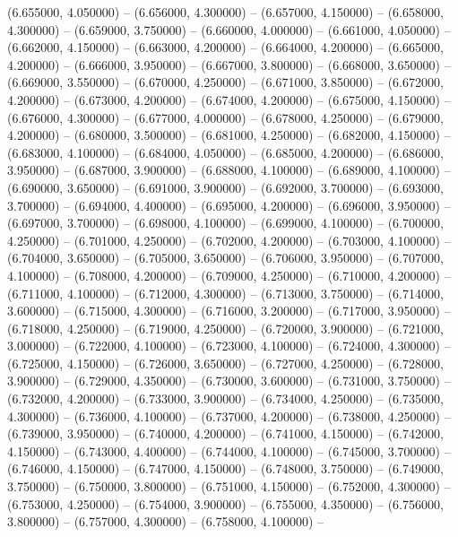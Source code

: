 (6.655000, 4.050000) -- 
(6.656000, 4.300000) -- 
(6.657000, 4.150000) -- 
(6.658000, 4.300000) -- 
(6.659000, 3.750000) -- 
(6.660000, 4.000000) -- 
(6.661000, 4.050000) -- 
(6.662000, 4.150000) -- 
(6.663000, 4.200000) -- 
(6.664000, 4.200000) -- 
(6.665000, 4.200000) -- 
(6.666000, 3.950000) -- 
(6.667000, 3.800000) -- 
(6.668000, 3.650000) -- 
(6.669000, 3.550000) -- 
(6.670000, 4.250000) -- 
(6.671000, 3.850000) -- 
(6.672000, 4.200000) -- 
(6.673000, 4.200000) -- 
(6.674000, 4.200000) -- 
(6.675000, 4.150000) -- 
(6.676000, 4.300000) -- 
(6.677000, 4.000000) -- 
(6.678000, 4.250000) -- 
(6.679000, 4.200000) -- 
(6.680000, 3.500000) -- 
(6.681000, 4.250000) -- 
(6.682000, 4.150000) -- 
(6.683000, 4.100000) -- 
(6.684000, 4.050000) -- 
(6.685000, 4.200000) -- 
(6.686000, 3.950000) -- 
(6.687000, 3.900000) -- 
(6.688000, 4.100000) -- 
(6.689000, 4.100000) -- 
(6.690000, 3.650000) -- 
(6.691000, 3.900000) -- 
(6.692000, 3.700000) -- 
(6.693000, 3.700000) -- 
(6.694000, 4.400000) -- 
(6.695000, 4.200000) -- 
(6.696000, 3.950000) -- 
(6.697000, 3.700000) -- 
(6.698000, 4.100000) -- 
(6.699000, 4.100000) -- 
(6.700000, 4.250000) -- 
(6.701000, 4.250000) -- 
(6.702000, 4.200000) -- 
(6.703000, 4.100000) -- 
(6.704000, 3.650000) -- 
(6.705000, 3.650000) -- 
(6.706000, 3.950000) -- 
(6.707000, 4.100000) -- 
(6.708000, 4.200000) -- 
(6.709000, 4.250000) -- 
(6.710000, 4.200000) -- 
(6.711000, 4.100000) -- 
(6.712000, 4.300000) -- 
(6.713000, 3.750000) -- 
(6.714000, 3.600000) -- 
(6.715000, 4.300000) -- 
(6.716000, 3.200000) -- 
(6.717000, 3.950000) -- 
(6.718000, 4.250000) -- 
(6.719000, 4.250000) -- 
(6.720000, 3.900000) -- 
(6.721000, 3.000000) -- 
(6.722000, 4.100000) -- 
(6.723000, 4.100000) -- 
(6.724000, 4.300000) -- 
(6.725000, 4.150000) -- 
(6.726000, 3.650000) -- 
(6.727000, 4.250000) -- 
(6.728000, 3.900000) -- 
(6.729000, 4.350000) -- 
(6.730000, 3.600000) -- 
(6.731000, 3.750000) -- 
(6.732000, 4.200000) -- 
(6.733000, 3.900000) -- 
(6.734000, 4.250000) -- 
(6.735000, 4.300000) -- 
(6.736000, 4.100000) -- 
(6.737000, 4.200000) -- 
(6.738000, 4.250000) -- 
(6.739000, 3.950000) -- 
(6.740000, 4.200000) -- 
(6.741000, 4.150000) -- 
(6.742000, 4.150000) -- 
(6.743000, 4.400000) -- 
(6.744000, 4.100000) -- 
(6.745000, 3.700000) -- 
(6.746000, 4.150000) -- 
(6.747000, 4.150000) -- 
(6.748000, 3.750000) -- 
(6.749000, 3.750000) -- 
(6.750000, 3.800000) -- 
(6.751000, 4.150000) -- 
(6.752000, 4.300000) -- 
(6.753000, 4.250000) -- 
(6.754000, 3.900000) -- 
(6.755000, 4.350000) -- 
(6.756000, 3.800000) -- 
(6.757000, 4.300000) -- 
(6.758000, 4.100000) -- 
